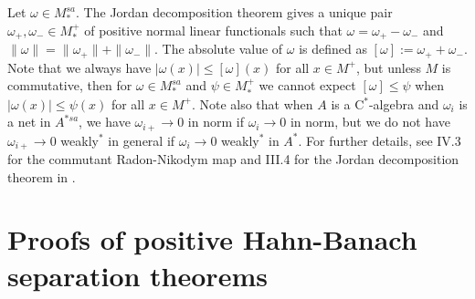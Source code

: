 \documentclass[noamsfonts,a4paper,10pt]{amsart}
\theoremstyle{plain}
\theoremstyle{definition}
\theoremstyle{remark}
\begin{document}
Let $\omega\in M_*^{sa}$.
The Jordan decomposition theorem gives a unique pair $\omega_+,\omega_-\in M_*^+$ of positive normal linear functionals such that $\omega=\omega_+-\omega_-$ and $\|\omega\|=\|\omega_+\|+\|\omega_-\|$.
The absolute value of $\omega$ is defined as $[\omega]:=\omega_++\omega_-$.
Note that we always have $|\omega(x)|\le[\omega](x)$ for all $x\in M^+$, but unless $M$ is commutative, then for $\omega\in M_*^{sa}$ and $\psi\in M_*^+$ we cannot expect $[\omega]\le\psi$ when $|\omega(x)|\le\psi(x)$ for all $x\in M^+$.
Note also that when $A$ is a C$^*$-algebra and $\omega_i$ is a net in $A^{*sa}$, we have $\omega_{i+}\to0$ in norm if $\omega_i\to0$ in norm, but we do not have $\omega_{i+}\to0$ weakly$^*$ in general if $\omega_i\to0$ weakly$^*$ in $A^*$.
For further details, see IV.3 for the commutant Radon-Nikodym map and III.4 for the Jordan decomposition theorem in \cite{MR1873025}.

\section{Proofs of positive Hahn-Banach separation theorems}
\end{document}
